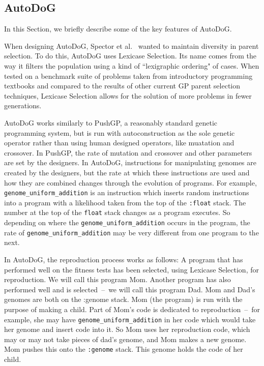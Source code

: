 \documentclass{sig-alternate}
\begin{document}
\subsection{AutoDoG}
\label{sec:autodog}
In this Section, we briefly describe some of the key features of AutoDoG.

When designing AutoDoG, Spector et al.~\cite{spector:2016} wanted to maintain diversity in parent selection. To do this, AutoDoG uses Lexicase Selection. Its name comes from the way it filters the population using a kind of ``lexigraphic ordering" of cases. When tested on a benchmark suite of problems taken from introductory programming textbooks and compared to the results of other current GP parent selection techniques, Lexicase Selection allows for the solution of more problems in fewer generations.

AutoDoG works similarly to PushGP, a reasonably standard genetic programming system, but is run with autoconstruction as the sole genetic operator rather than using human designed operators, like muatation and crossover. In PushGP, the rate of mutation and crossover and other parameters are set by the designers. In AutoDoG, instructions for manipulating genomes are created by the designers, but the rate at which these instructions are used and how they are combined changes through the evolution of programs. For example, \texttt{genome\_uniform\_addition} is an instruction which inserts random instructions into a program with a likelihood taken from the top of the \texttt{:float} stack. The number at the top of the \texttt{float} stack changes as a program executes. So depending on where the \texttt{genome\_uniform\_addition} occurs in the program, the rate of \texttt{genome\_uniform\_addition} may be very different from one program to the next.

In AutoDoG, the reproduction process works as follows:
A program that has performed well on the fitness tests has been selected, using Lexicase Selection, for reproduction. We will call this program Mom. Another program has also performed well and is selected~--~we will call this program Dad. Mom and Dad's genomes are both on the :genome stack. Mom (the program) is run with the purpose of making a child. Part of Mom's code is dedicated to reproduction~--~for example, she may have \texttt{genome\_uniform\_addition} in her code which would take her genome and insert code into it. So Mom uses her reproduction code, which may or may not take pieces of dad's genome, and Mom makes a new genome. Mom pushes this onto the \texttt{:genome} stack. This genome holds the code of her child.
\end{document}
